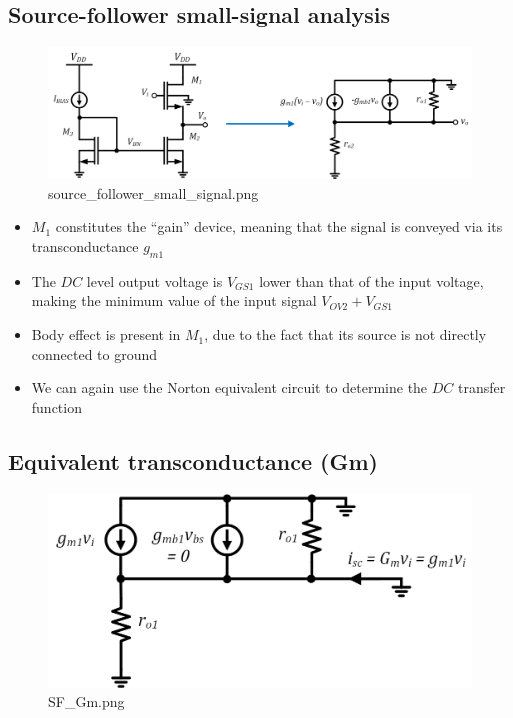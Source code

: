 \documentclass[11pt]{article}
\begin{document}
    \hypertarget{source-follower-small-signal-analysis}{%
\subsection{Source-follower small-signal
analysis}\label{source-follower-small-signal-analysis}}

    \begin{figure}
\centering
\includegraphics{source_follower_small_signal.png}
\caption{source\_follower\_small\_signal.png}
\end{figure}

    \begin{itemize}
\item
  \(M_1\) constitutes the ``gain'' device, meaning that the signal is
  conveyed via its transconductance \(g_{m1}\)
\item
  The \(DC\) level output voltage is \(V_{GS1}\) lower than that of the
  input voltage, making the minimum value of the input signal
  \(V_{OV2} + V_{GS1}\)
\item
  Body effect is present in \(M_1\), due to the fact that its source is
  not directly connected to ground
\item
  We can again use the Norton equivalent circuit to determine the \(DC\)
  transfer function
\end{itemize}

    \hypertarget{equivalent-transconductance-gm}{%
\subsection{Equivalent transconductance
(Gm)}\label{equivalent-transconductance-gm}}

    \begin{figure}
\centering
\includegraphics{SF_Gm.png}
\caption{SF\_Gm.png}
\end{figure}
\end{document}
